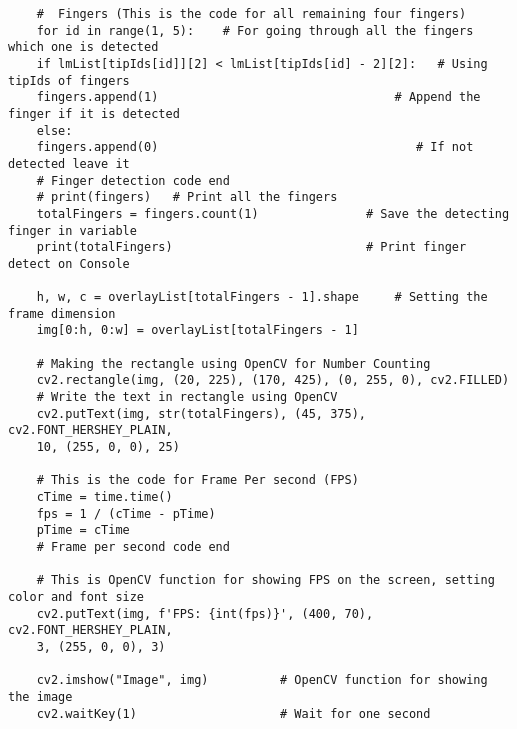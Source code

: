 \begin{verbatim}
	#  Fingers (This is the code for all remaining four fingers)
	for id in range(1, 5):    # For going through all the fingers which one is detected
	if lmList[tipIds[id]][2] < lmList[tipIds[id] - 2][2]:   # Using tipIds of fingers
	fingers.append(1)                                 # Append the finger if it is detected
	else:
	fingers.append(0)                                    # If not detected leave it
	# Finger detection code end
	# print(fingers)   # Print all the fingers
	totalFingers = fingers.count(1)               # Save the detecting finger in variable
	print(totalFingers)                           # Print finger detect on Console
	
	h, w, c = overlayList[totalFingers - 1].shape     # Setting the frame dimension
	img[0:h, 0:w] = overlayList[totalFingers - 1]
	
	# Making the rectangle using OpenCV for Number Counting
	cv2.rectangle(img, (20, 225), (170, 425), (0, 255, 0), cv2.FILLED)
	# Write the text in rectangle using OpenCV
	cv2.putText(img, str(totalFingers), (45, 375), cv2.FONT_HERSHEY_PLAIN,
	10, (255, 0, 0), 25)
	
	# This is the code for Frame Per second (FPS)
	cTime = time.time()
	fps = 1 / (cTime - pTime)
	pTime = cTime
	# Frame per second code end
	
	# This is OpenCV function for showing FPS on the screen, setting color and font size
	cv2.putText(img, f'FPS: {int(fps)}', (400, 70), cv2.FONT_HERSHEY_PLAIN,
	3, (255, 0, 0), 3)
	
	cv2.imshow("Image", img)          # OpenCV function for showing the image
	cv2.waitKey(1)                    # Wait for one second
\end{verbatim}

